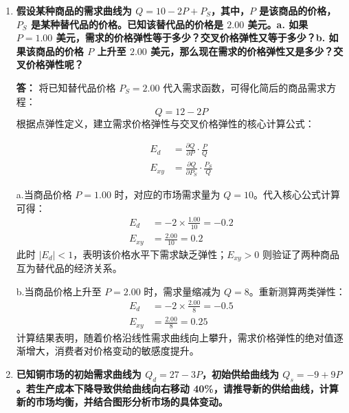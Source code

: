 \begin{enumerate}[label=\textbf{\arabic*.}, leftmargin=*]
\begin{center}
		\end{center}
		
		结论：该官员将“需求的变动”（曲线右移）错误地解读为“需求完全无弹性”。如果该校保持学费不变，申请人数本应增加更多（增加到 $D_1$ 在 $P_0$ 对应的水平）。因此，不能依据学费和人数同步增长的事实来断定需求缺乏弹性。

		\item \textbf{假设某种商品的需求曲线为 $Q=10-2P+P_S$，其中，$P$ 是该商品的价格，$P_S$ 是某种替代品的价格。已知该替代品的价格是 $2.00$ 美元。a. 如果 $P=1.00$ 美元，需求的价格弹性等于多少？交叉价格弹性又等于多少？b. 如果该商品的价格 $P$ 上升至 $2.00$ 美元，那么现在需求的价格弹性又是多少？交叉价格弹性呢？}
		
		\textbf{答：}
		将已知替代品价格 $P_S = 2.00$ 代入需求函数，可得化简后的商品需求方程：
		$$Q = 12 - 2P$$
		根据点弹性定义，建立需求价格弹性与交叉价格弹性的核心计算公式：

			$$
			\begin{aligned}
				E_d &= \frac{\partial Q}{\partial P} \cdot \frac{P}{Q}\\
				E_{xy} &= \frac{\partial Q}{\partial P_S} \cdot \frac{P_S}{Q}
			\end{aligned}
			$$

		
		a.当商品价格 $P = 1.00$ 时，对应的市场需求量为 $Q = 10$。代入核心公式计算可得：
		$$
		\begin{aligned}
			E_d &= -2 \times \frac{1.00}{10} = -0.2 \\
			E_{xy} &= \frac{2.00}{10} = 0.2
		\end{aligned}
		$$
		此时 $|E_d| < 1$，表明该价格水平下需求缺乏弹性；$E_{xy} > 0$ 则验证了两种商品互为替代品的经济关系。
		
		b.当商品价格上升至 $P = 2.00$ 时，需求量缩减为 $Q = 8$。重新测算两类弹性：
		$$
		\begin{aligned}
			E_d &= -2 \times \frac{2.00}{8} = -0.5 \\
			E_{xy} &= \frac{2.00}{8} = 0.25
		\end{aligned}
		$$
		计算结果表明，随着价格沿线性需求曲线向上攀升，需求价格弹性的绝对值逐渐增大，消费者对价格变动的敏感度提升。

		\item \textbf{已知铜市场的初始需求曲线为 $Q_d = 27 - 3P$，初始供给曲线为 $Q_s = -9 + 9P$。若生产成本下降导致供给曲线向右移动 40\%，请推导新的供给曲线，计算新的市场均衡，并结合图形分析市场的具体变动。}
		

\end{enumerate}

